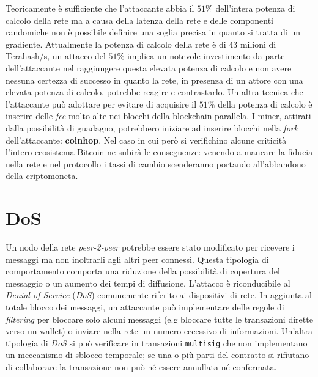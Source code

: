Teoricamente è sufficiente che l'attaccante abbia il $51\%$ dell'intera potenza di calcolo della rete ma a causa della latenza della rete e delle componenti randomiche non è possibile definire una soglia precisa in quanto si tratta di un gradiente.\newline
Attualmente la potenza di calcolo della rete è di $43$ milioni di Terahash/s, un attacco del $51\%$ implica un notevole investimento da parte dell'attaccante nel raggiungere questa elevata potenza di calcolo e non avere nessuna certezza di successo in quanto la rete, in presenza di un attore con una elevata potenza di calcolo, potrebbe reagire e contrastarlo. Un altra tecnica che l'attaccante può adottare per evitare di acquisire il $51\%$ della potenza di calcolo è inserire delle \textit{fee} molto alte nei blocchi della blockchain parallela. I miner, attirati dalla possibilità di guadagno, potrebbero iniziare ad inserire blocchi nella \textit{fork} dell'attaccante: \textbf{coinhop}.\newline
Nel caso in cui però si verifichino alcune criticità l'intero ecosistema Bitcoin ne subirà le conseguenze: venendo a mancare la fiducia nella rete e nel protocollo i tassi di cambio scenderanno portando all'abbandono della criptomoneta.\newline

\section{DoS}
Un nodo della rete \textit{peer-2-peer} potrebbe essere stato modificato per ricevere i messaggi ma non inoltrarli agli altri peer connessi. Questa tipologia di comportamento comporta una riduzione della possibilità di copertura del messaggio o un aumento dei tempi di diffusione. L'attacco è riconducibile al \textit{Denial of Service} (\textit{DoS}) comunemente riferito ai dispositivi di rete.\newline
In aggiunta al totale blocco dei messaggi, un attaccante può implementare delle regole di \textit{filtering} per bloccare solo alcuni messaggi (e.g bloccare tutte le transazioni dirette verso un wallet) o inviare nella rete un numero eccessivo di informazioni.\newline
Un'altra tipologia di \textit{DoS} si può verificare in transazioni \texttt{multisig} che non implementano un meccanismo di sblocco temporale; se una o più parti del contratto si rifiutano di collaborare la transazione non può né essere annullata né confermata.

